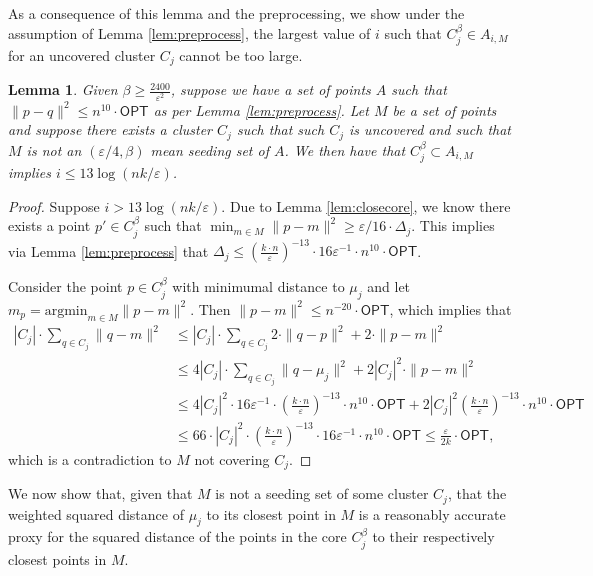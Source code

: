 \documentclass[11pt]{article}
\newtheorem{lemma}[theorem]{Lemma}
\def \OPT    {\mdef{\mathsf{OPT}}}
\newcommand{\mdef}[1]{{\ensuremath{#1}}\xspace}  %
\begin{document}
As a consequence of this lemma and the preprocessing, we show under the assumption of Lemma \ref{lem:preprocess}, the largest value of $i$ such that $C_j^\beta \in A_{i,M}$ for an uncovered cluster $C_j$ cannot be too large.
\begin{lemma}
\label{lem:preprocess2}
    Given $\beta \geq \frac{2400}{\varepsilon^{2}}$,
    suppose we have a set of points $A$ such that $\|p-q\|^2 \leq n^{10}\cdot \OPT$ as per Lemma \ref{lem:preprocess}. 
    Let $M$ be a set of points and suppose there exists a cluster $C_j$ such that such $C_j$ is uncovered and such that $M$ is not an $(\varepsilon/4,\beta)$ mean seeding set of $A$. We then have that $C_j^\beta \subset A_{i,M}$ implies $i\leq 13 \log(nk/\varepsilon)$.
\end{lemma}
\begin{proof}
    Suppose $i> 13 \log(nk/\varepsilon)$. 
    Due to Lemma \ref{lem:closecore}, we know there exists a point $p'\in C_j^\beta$ such that $\min_{m\in M} \|p-m\|^2 \geq \varepsilon/16\cdot \Delta_j$. This implies via Lemma \ref{lem:preprocess} that $\Delta_j \leq \left(\frac{k \cdot n}{\varepsilon}\right)^{-13}\cdot 16\varepsilon^{-1}\cdot n^{10}\cdot\OPT$.
    
    Consider the point $p\in C_j^\beta$ with minimumal distance to $\mu_j$ and let $m_p=\text{argmin}_{m\in M} \|p-m\|^2$. Then $\|p-m\|^2 \leq n^{-20}\cdot \OPT$, which implies that 
    \begin{align*}
        |C_j|\cdot \sum_{q\in C_j}\|q-m\|^2 &\leq |C_j|\cdot\sum_{q\in C_j}2\cdot\|q-p\|^2+2\cdot\|p-m\|^2 \\
        & \leq  4|C_j|\cdot \sum_{q\in C_j}\|q-\mu_j\|^2+2 |C_j|^2\cdot\|p-m\|^2 \\
        &\leq 4|C_j|^2\cdot 16 \varepsilon^{-1}\cdot \left(\frac{k \cdot n}{\varepsilon}\right)^{-13}\cdot n^{10}\cdot\OPT + 2 |C_j|^2 \left(\frac{k \cdot n}{\varepsilon}\right)^{-13}\cdot  n^{10}\cdot\OPT \\
        &\leq 66\cdot |C_j|^2\cdot\left(\frac{k \cdot n}{\varepsilon}\right)^{-13}\cdot 16\varepsilon^{-1}\cdot n^{10}\cdot\OPT \leq \frac{\varepsilon}{2k}\cdot\OPT,
    \end{align*}
     which is a contradiction to $M$ not covering $C_j$.
\end{proof}

We now show that, given that $M$ is not a seeding set of some cluster $C_j$, that the weighted squared distance of $\mu_j$ to its closest point in $M$ is a reasonably accurate proxy for the squared distance of the points in the core $C_j^\beta$ to their respectively closest points in $M$.
\end{document}

